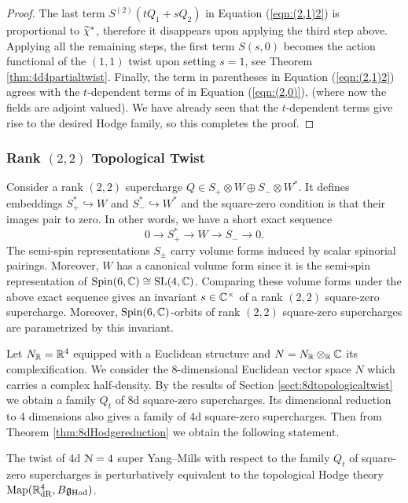 \documentclass[10pt, oneside]{article}
\begin{document}
\begin{proof}
The last term $S^{(2)}(tQ_1 + sQ_2)$ in Equation (\ref{eqn:(2,1)2}) is proportional to $\Tilde{\chi}^*$, therefore it disappears upon applying the third step above. 
Applying all the remaining steps, the first term $S(s,0)$ becomes the action functional of the $(1,1)$ twist upon setting $s=1$, see Theorem \ref{thm:4d4partialtwist}. 
Finally, the term in parentheses in Equation (\ref{eqn:(2,1)2}) agrees with the $t$-dependent terms of in Equation (\ref{eqn:(2,0)}), (where now the fields are adjoint valued). 
We have already seen that the $t$-dependent terms give rise to the desired Hodge family, so this completes the proof. 
\end{proof}

\subsubsection{Rank \texorpdfstring{$(2, 2)$}{(2,2)} Topological Twist}
\label{sect:4dqgltwist}

Consider a rank $(2, 2)$ supercharge $Q\in S_+\otimes W\oplus S_-\otimes W^*$. It defines embeddings $S_+^*\hookrightarrow W$ and $S_-^*\hookrightarrow W^*$ and the square-zero condition is that their images pair to zero. In other words, we have a short exact sequence
\[0\longrightarrow S_+^*\longrightarrow W\longrightarrow S_-\longrightarrow 0.\]
The semi-spin representations $S_\pm$ carry volume forms induced by scalar spinorial pairings. Moreover, $W$ has a canonical volume form since it is the semi-spin representation of $\Spin(6, \CC)\cong \SL(4, \CC)$. Comparing these volume forms under the above exact sequence gives an invariant $s\in\CC^\times$ of a rank $(2, 2)$ square-zero supercharge. Moreover, $\Spin(6, \CC)$-orbits of rank $(2, 2)$ square-zero supercharges are parametrized by this invariant.

Let $N_\RR=\RR^4$ equipped with a Euclidean structure and $N=N_\RR\otimes_\RR\CC$ its complexification. We consider the 8-dimensional Euclidean vector space $N$ which carries a complex half-density. By the results of Section \ref{sect:8dtopologicaltwist} we obtain a family $Q_t$ of 8d square-zero supercharges. Its dimensional reduction to 4 dimensions also gives a family of 4d square-zero supercharges. Then from Theorem \ref{thm:8dHodgereduction} we obtain the following statement.

\begin{theorem}
The twist of 4d $\cN=4$ super Yang--Mills with respect to the family $Q_t$ of square-zero supercharges is perturbatively equivalent to the topological Hodge theory $\map(\RR^4_{\mathrm{dR}}, B\fg_{\Hod})$.
\label{thm:4d422Hodgetwist}
\end{theorem}
\end{document}
